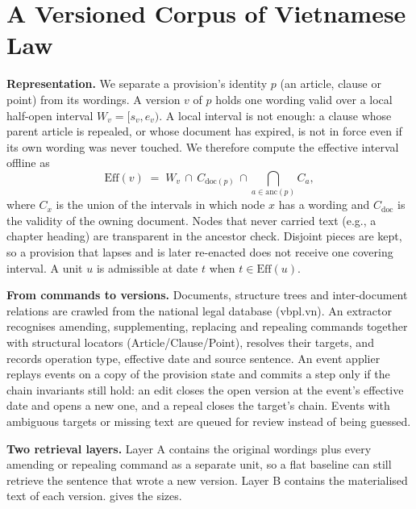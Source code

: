 \documentclass[sigconf,anonymous,review]{acmart}
\begin{document}
\section{A Versioned Corpus of Vietnamese Law}
\label{sec:corpus}

\textbf{Representation.} We separate a provision's identity $p$ (an article, clause or point) from its wordings. A version $v$ of $p$ holds one wording valid over a local half-open interval $W_v=[s_v,e_v)$. A local interval is not enough: a clause whose parent article is repealed, or whose document has expired, is not in force even if its own wording was never touched. We therefore compute the effective interval offline as
\begin{equation}
\mathrm{Eff}(v) \;=\; W_v \,\cap\, C_{\mathrm{doc}(p)} \,\cap\! \bigcap_{a\in\mathrm{anc}(p)}\! C_a ,
\label{eq:eff}
\end{equation}
where $C_x$ is the union of the intervals in which node $x$ has a wording and $C_{\mathrm{doc}}$ is the validity of the owning document. Nodes that never carried text (e.g., a chapter heading) are transparent in the ancestor check. Disjoint pieces are kept, so a provision that lapses and is later re-enacted does not receive one covering interval. A unit $u$ is admissible at date $t$ when $t\in\mathrm{Eff}(u)$.

\textbf{From commands to versions.} Documents, structure trees and inter-document relations are crawled from the national legal database (vbpl.vn). An extractor recognises amending, supplementing, replacing and repealing commands together with structural locators (Article/Clause/Point), resolves their targets, and records operation type, effective date and source sentence. An event applier replays events on a copy of the provision state and commits a step only if the chain invariants still hold: an edit closes the open version at the event's effective date and opens a new one, and a repeal closes the target's chain. Events with ambiguous targets or missing text are queued for review instead of being guessed.

\textbf{Two retrieval layers.} Layer A contains the original wordings plus every amending or repealing command as a separate unit, so a flat baseline can still retrieve the sentence that wrote a new version. Layer B contains the materialised text of each version.  gives the sizes.
\end{document}
